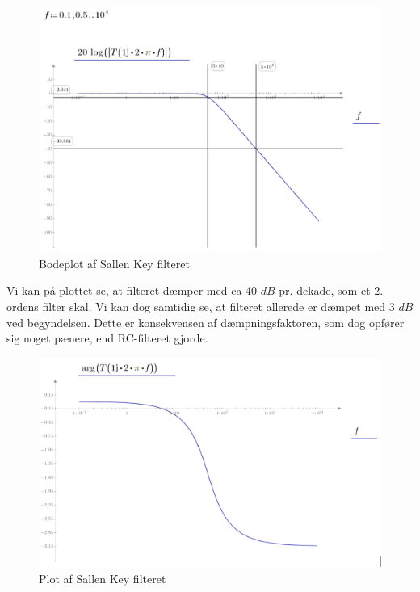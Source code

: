 \begin{figure}[h!]
	\centering
	\includegraphics[width=0.7\linewidth]{Hardware/Filterplot1}
	\caption{Bodeplot af Sallen Key filteret}
	\label{fig:Filterplot1}
\end{figure}

Vi kan på plottet se, at filteret dæmper med ca 40 $ dB $ pr. dekade, som et 2. ordens filter skal. Vi kan dog samtidig se, at filteret allerede er dæmpet med 3 $ dB $ ved begyndelsen. Dette er konsekvensen af dæmpningsfaktoren, som dog opfører sig noget pænere, end RC-filteret gjorde. 

\begin{figure}[h!]
	\centering
	\includegraphics[width=0.7\linewidth]{Hardware/Filterplot2}
	\caption{Plot af Sallen Key filteret}
	\label{fig:Filterplot2}
\end{figure}

\clearpage

